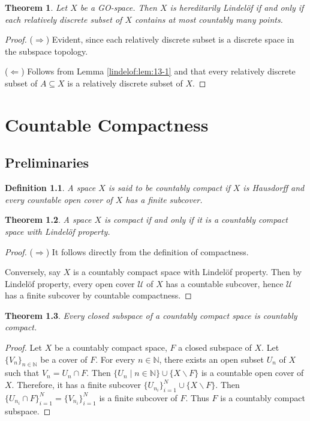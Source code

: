 \documentclass[12pt,oneside,english]{amsbook}
\numberwithin{equation}{section} %
\numberwithin{figure}{section} %
\theoremstyle{plain}
\numberwithin{section}{chapter}
\newtheorem{thm}{Theorem}[section]
\theoremstyle{plain}
\newtheorem{defn}[thm]{Definition}
\begin{document}
\begin{thm}\label{lindelof:thm:14}
  Let $X$ be a GO-space. Then $X$ is hereditarily Lindel\"{o}f if and only if each relatively discrete subset of $X$ contains at most countably many points.
\end{thm}
\begin{proof}
  ($\Rightarrow$) Evident, since each relatively discrete subset is a discrete space in the subspace topology.

  ($\Leftarrow$) Follows from Lemma \ref{lindelof:lem:13-1} and that every relatively discrete subset of $A \subseteq X$ is a relatively discrete subset of $X$.  
\end{proof}

\chapter{Countable Compactness}

\section{Preliminaries}
\begin{defn}
  A space $X$ is said to be countably compact if $X$ is Hausdorff and every countable open cover of $X$ has a finite subcover.
\end{defn}

\begin{thm}
  A space $X$ is compact if and only if it is a countably compact space with Lindel\"{o}f property.
\end{thm}
\begin{proof}
  ($\Rightarrow$) It follows directly from the definition of compactness.

  Conversely, say $X$ is a countably compact space with Lindel\"{o}f property. Then by  Lindel\"{o}f property, every open cover $\mathcal{U}$ of $X$ has a countable subcover, hence $\mathcal{U}$ has a finite subcover by countable compactness.
\end{proof}

\begin{thm}
  Every closed subspace of a countably compact space is countably compact.
\end{thm}
\begin{proof}
  Let $X$ be a countably compact space, $F$ a closed subspace of $X$. Let $\{V_{n}\}_{n \in \mathbb{N}}$ be a cover of $F$. For every $n \in \mathbb{N}$, there exists an open subset $U_n$ of $X$ such that $V_n = U_n \cap F$. Then $\{U_{n} \; | \; n \in \mathbb{N} \} \cup \{X \backslash F \}$ is a countable open cover of $X$. Therefore, it has a finite subcover $\{U_{n_i}\}_{i = 1}^{N} \cup \{X \backslash F \}$. Then  $\{U_{n_i} \cap F \}_{i = 1}^{N} = \{V_{n_i}\}_{i=1}^N$ is a finite subcover of $F$. Thus $F$ is a countably compact subspace.
\end{proof}
\end{document}
